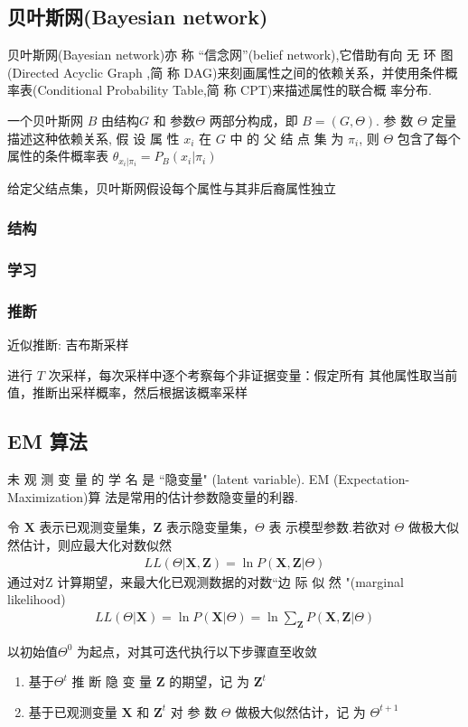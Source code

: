 \subsection{贝叶斯网(Bayesian network)}
贝叶斯网(Bayesian network)亦 称 “信念网”(belief network),它借助有向
无 环 图 (Directed Acyclic Graph ,简 称 DAG)来刻画属性之间的依赖关系，并使用条件概率表(Conditional Probability Table,简 称 CPT)来描述属性的联合概
率分布.

一个贝叶斯网 $B$ 由结构$G$ 和 参数$\Theta$ 两部分构成，即 $B=(G, \Theta)$. 参 数 $\Theta$ 定量描述这种依赖关系, 假 设 属 性 $x_i$ 在 $G$ 中 的 父 结 点 集 为 $\pi_i$, 则 $\Theta$ 包含了每个属性的条件概率表 $\theta_{x_i|\pi_i}=P_B(x_i|\pi_i)$

给定父结点集，贝叶斯网假设每个属性与其非后裔属性独立

\subsubsection{结构}
\subsubsection{学习}
\subsubsection{推断}
近似推断: 吉布斯采样

进行 $T$ 次采样，每次采样中逐个考察每个非证据变量：假定所有
其他属性取当前值，推断出采样概率，然后根据该概率采样

\subsection{EM 算法}
未 观 测 变 量 的 学 名 是 “隐变量" (latent variable). EM (Expectation-Maximization)算 法是常用的估计参数隐变量的利器. 

令 $\bm X$ 表示已观测变量集，$\bm Z$ 表示隐变量集，$\Theta$ 表 示模型参数.若欲对 $\Theta$ 做极大似然估计，则应最大化对数似然
\begin{align*}
    LL(\Theta|\bm X,\bm Z)=\ln P(\bm X, \bm Z |\Theta)
\end{align*}
通过对Z 计算期望，来最大化已观测数据的对数“边 际 似 然 "(marginal likelihood)
\begin{align*}
    LL(\Theta|\bm X)=\ln P(\bm X|\Theta)=\ln \sum_{\bm Z}P(\bm X, \bm Z|\Theta)
\end{align*}

以初始值$\Theta^0$ 为起点，对其可迭代执行以下步骤直至收敛
\begin{enumerate}
    \item  基于$\Theta^t$ 推 断 隐 变 量 $\bm Z$ 的期望，记 为 $\bm Z^t$
    \item 基于已观测变量 $\bm X$ 和 $\bm Z^t$ 对 参 数 $\Theta$ 做极大似然估计，记 为 $\Theta^{t+1}$
\end{enumerate}

